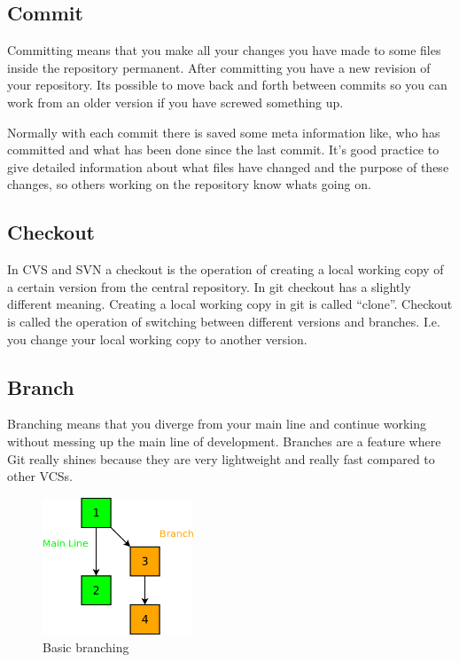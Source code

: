 \subsection{Commit}

Committing means that you make all your changes you have made to some files inside the repository permanent. 
After committing you have a new revision of your repository. Its possible to move back and forth between commits so you can work 
from an older version if you have screwed something up.

Normally with each commit there is saved some meta information like, who has committed and what has been done since the last commit. 
It's good practice to give detailed information about what files have changed and the purpose of these changes, so others working 
on the repository know whats going on.


\subsection{Checkout}

In CVS and SVN a checkout is the operation of creating a local working copy of a certain version from the 
central repository. In git checkout has a slightly different meaning. Creating a local working copy in git is 
called “clone”. Checkout is called the operation of switching between different versions and branches. I.e. 
you change your local working copy to another version.


\subsection{Branch}

Branching means that you diverge from your main line and continue working without messing up the main line of 
development. Branches are a feature where Git really shines because they are very lightweight and really fast compared to other VCSs.

\begin{figure}[ht]
  \centering
  \includegraphics[width=0.4\textwidth]{img/Gen_Branch}
  \caption{Basic branching}
  \label{fig:gen_branch} 
\end{figure}

